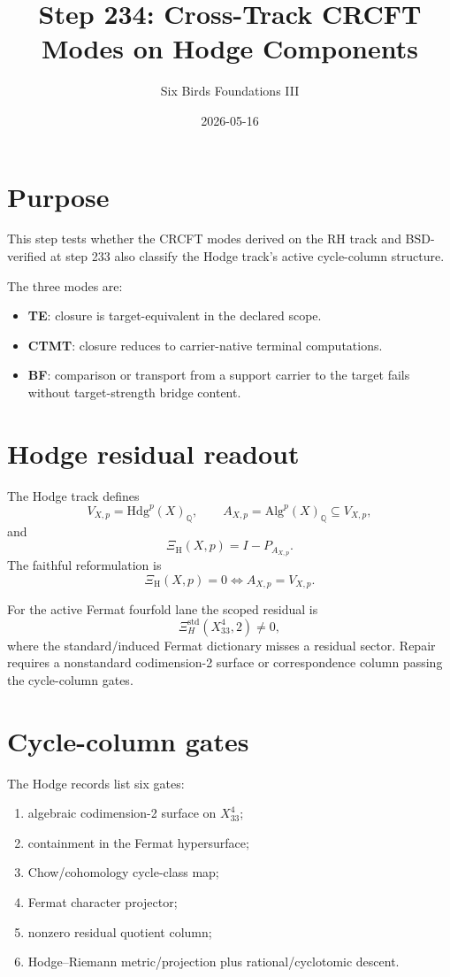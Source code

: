 \documentclass[11pt]{article}
\title{Step 234: Cross-Track CRCFT Modes on Hodge Components}
\author{Six Birds Foundations III}
\date{2026-05-16}
\newcommand{\XiH}{\Xi_{\mathrm H}}
\begin{document}
\maketitle

\section{Purpose}

This step tests whether the CRCFT modes derived on the RH track and BSD-verified at step 233 also classify the Hodge track's active cycle-column structure.

The three modes are:
\begin{itemize}
\item \textbf{TE}: closure is target-equivalent in the declared scope.
\item \textbf{CTMT}: closure reduces to carrier-native terminal computations.
\item \textbf{BF}: comparison or transport from a support carrier to the target fails without target-strength bridge content.
\end{itemize}

\section{Hodge residual readout}

The Hodge track defines
\[
V_{X,p}=\mathrm{Hdg}^p(X)_{\mathbb Q},\qquad
A_{X,p}=\mathrm{Alg}^p(X)_{\mathbb Q}\subseteq V_{X,p},
\]
and
\[
\XiH(X,p)=I-P_{A_{X,p}}.
\]
The faithful reformulation is
\[
\XiH(X,p)=0 \Longleftrightarrow A_{X,p}=V_{X,p}.
\]

For the active Fermat fourfold lane the scoped residual is
\[
\Xi_H^{\mathrm{std}}(X^4_{33},2)\ne 0,
\]
where the standard/induced Fermat dictionary misses a residual sector. Repair requires a nonstandard codimension-2 surface or correspondence column passing the cycle-column gates.

\section{Cycle-column gates}

The Hodge records list six gates:
\begin{enumerate}
\item algebraic codimension-2 surface on \(X^4_{33}\);
\item containment in the Fermat hypersurface;
\item Chow/cohomology cycle-class map;
\item Fermat character projector;
\item nonzero residual quotient column;
\item Hodge--Riemann metric/projection plus rational/cyclotomic descent.
\end{enumerate}
\end{document}
